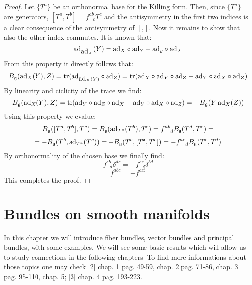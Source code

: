 \documentclass[12pt,a4paper]{report}
\theoremstyle{definition}
\theoremstyle{Theorem}
\theoremstyle{definition}
\theoremstyle{definition}
\begin{document}
	\begin{proof}
		Let $\{T^a\}$ be an orthonormal base for the Killing form. Then, since $\{T^a\}$ are generators, $[T^a,T^b]=f^{ab}_{\hspace{9pt}c}T^c$ and the antisymmetry in the first two indices is a clear consequence of the antisymmetry of $[,]$. Now it remains to show that also the other index commutes. It is known that:
		$$\hbox{ad}_{\hbox{ad}_X}(Y)=\hbox{ad}_X\circ \hbox{ad}_Y-\hbox{ad}_y\circ \hbox{ad}_X$$
		From this property it directly follows that:
		$$B_\mathfrak{g}(\hbox{ad}_X(Y),Z)=\hbox{tr}(\hbox{ad}_{\hbox{ad}_X(Y)}\circ \hbox{ad}_Z)=\hbox{tr}(\hbox{ad}_X\circ \hbox{ad}_Y\circ \hbox{ad}_Z-\hbox{ad}_Y\circ\hbox{ad}_X\circ \hbox{ad}_Z)$$
		By linearity and ciclicity of the trace we find:
		$$B_\mathfrak{g}(\hbox{ad}_X(Y),Z)=\hbox{tr}(\hbox{ad}_Y\circ \hbox{ad}_Z\circ \hbox{ad}_X-\hbox{ad}_Y\circ\hbox{ad}_X\circ \hbox{ad}_Z)=-B_\mathfrak{g}(Y,\hbox{ad}_X(Z))$$
		Using this property we evalue:
		$$B_\mathfrak{g}([T^a,T^b],T^c)=B_\mathfrak{g}(\hbox{ad}_{T^a}(T^b),T^c)=f^{ab}_{\hspace{9pt}d}B_\mathfrak{g}(T^d,T^c)=$$
		$$=-B_\mathfrak{g}(T^b,\hbox{ad}_{T^a}(T^c))=-B_\mathfrak{g}(T^b,[T^a,T^c])=-f^{ac}_{\hspace{9pt}d}B_\mathfrak{g}(T^c,T^d)$$
		By orthonormality of the chosen base we finally find:
		$$f^{ab}_{\hspace{9pt}d}\delta^{dc}=-f^{ac}_{\hspace{9pt}d}\delta^{bd}$$
		$$f^{abc}=-f^{acb}$$
		This completes the proof.
	\end{proof}
	\chapter{Bundles on smooth manifolds}
	In this chapter we will introduce fiber bundles, vector bundles and principal bundles, with some examples. We will see some basic results which will allow us to study connections in the following chapters. To find more informations about those topics one may check [2] chap. 1 pag. 49-59, chap. 2 pag. 71-86, chap. 3 pag. 95-110, chap. 5; [3] chap. 4 pag. 193-223.
\end{document}

